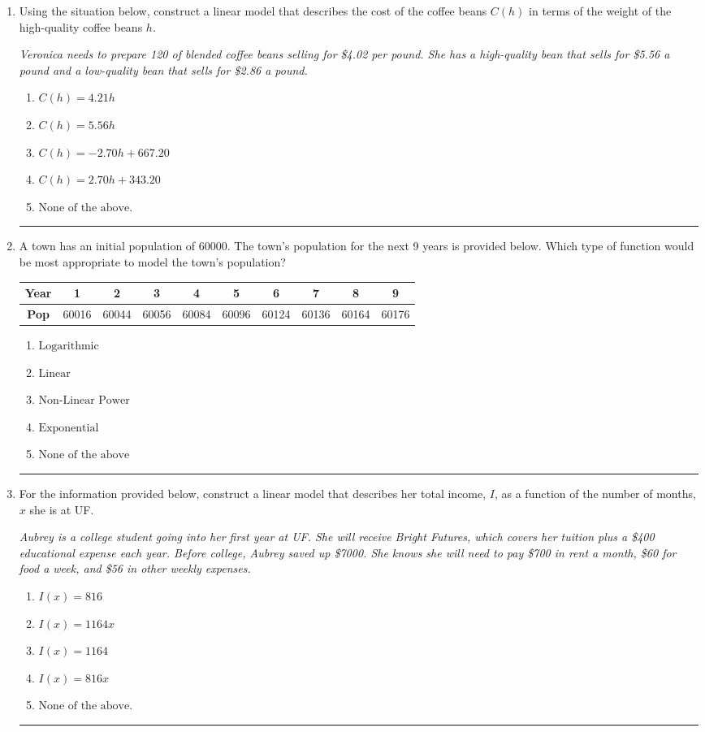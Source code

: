 \documentclass[14pt]{extbook}
\newcommand{\litem}[1]{\item#1\hspace*{-1cm}\rule{\textwidth}{0.4pt}}
\begin{document}
\begin{enumerate}
\litem{
Using the situation below, construct a linear model that describes the cost of the coffee beans $C(h)$ in terms of the weight of the high-quality coffee beans $h$.
\begin{center}
    \textit{ Veronica needs to prepare 120 of blended coffee beans selling for \$4.02 per pound. She has a high-quality bean that sells for \$5.56 a pound and a low-quality bean that sells for \$2.86 a pound. }
\end{center}
\begin{enumerate}[label=\Alph*.]
\item \( C(h) = 4.21 h \)
\item \( C(h) = 5.56 h \)
\item \( C(h) = -2.70 h + 667.20 \)
\item \( C(h) = 2.70 h + 343.20 \)
\item \( \text{None of the above.} \)

\end{enumerate} }
\litem{
A town has an initial population of 60000. The town's population for the next 9 years is provided below. Which type of function would be most appropriate to model the town's population?

\begin{tabular}{c|c|c|c|c|c|c|c|c|c}
\textbf{Year} &1 &2 &3 &4 &5 &6 &7 &8 &9\tabularnewline \hline
\textbf{Pop} &60016 &60044 &60056 &60084 &60096 &60124 &60136 &60164 &60176\end{tabular}\begin{enumerate}[label=\Alph*.]
\item \( \text{Logarithmic} \)
\item \( \text{Linear} \)
\item \( \text{Non-Linear Power} \)
\item \( \text{Exponential} \)
\item \( \text{None of the above} \)

\end{enumerate} }
\litem{
For the information provided below, construct a linear model that describes her total income, $I$, as a function of the number of months, $x$ she is at UF.
\begin{center}
    \textit{ Aubrey is a college student going into her first year at UF. She will receive Bright Futures, which covers her tuition plus a \$400 educational expense each year. Before college, Aubrey saved up \$7000. She knows she will need to pay \$700 in rent a month, \$60 for food a week, and \$56 in other weekly expenses. }
\end{center}
\begin{enumerate}[label=\Alph*.]
\item \( I(x) = 816 \)
\item \( I(x) = 1164 x \)
\item \( I(x) = 1164 \)
\item \( I(x) = 816 x \)
\item \( \text{None of the above.} \)


\end{enumerate}}
\end{enumerate}
\end{document}
